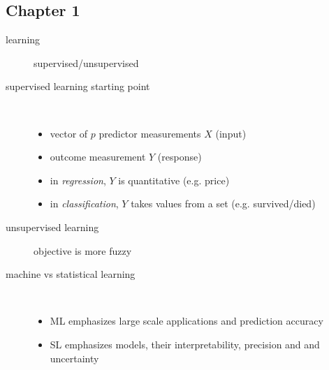 \documentclass[12pt]{article}
\newcommand{\hitem}[1][default] {
    \item[#1] \hfill \\ 
}
\begin{document}
\subsection{Chapter 1}

\begin{description}

    \item[learning] supervised/unsupervised
    
    \hitem[supervised learning starting point]
    \begin{itemize}
        \item vector of $p$ predictor measurements $X$ (input)
        \item outcome measurement $Y$ (response)
        \item in \emph{regression}, $Y$ is quantitative (e.g. price)
        \item in \emph{classification}, $Y$ takes values from a set (e.g.
            survived/died)
    \end{itemize}
    
    \item[unsupervised learning] objective is more fuzzy
    
    \hitem[machine vs statistical learning]
    \begin{itemize}
        \item ML emphasizes large scale applications and prediction accuracy
        \item SL emphasizes models, their interpretability, precision and
            and uncertainty        
    \end{itemize}
    
\end{description}
\end{document}
